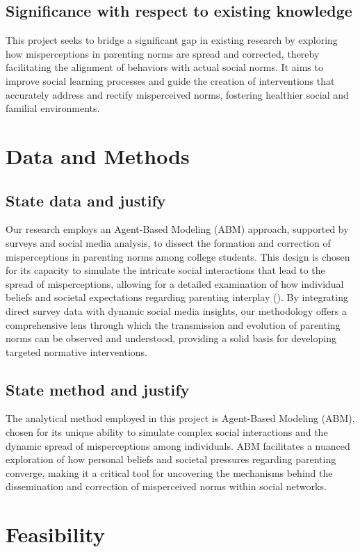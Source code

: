 \documentclass{article}
\begin{document}
\subsection*{Significance with respect to existing knowledge}
This project seeks to bridge a significant gap in existing research by exploring how misperceptions in parenting norms are spread and corrected, thereby facilitating the alignment of behaviors with actual social norms. It aims to improve social learning processes and guide the creation of interventions that accurately address and rectify misperceived norms, fostering healthier social and familial environments.

\section{Data and Methods}
\subsection*{State data and justify}
Our research employs an Agent-Based Modeling (ABM) approach, supported by surveys and social media analysis, to dissect the formation and correction of misperceptions in parenting norms among college students. This design is chosen for its capacity to simulate the intricate social interactions that lead to the spread of misperceptions, allowing for a detailed examination of how individual beliefs and societal expectations regarding parenting interplay (). By integrating direct survey data with dynamic social media insights, our methodology offers a comprehensive lens through which the transmission and evolution of parenting norms can be observed and understood, providing a solid basis for developing targeted normative interventions.


\subsection*{State method and justify}
The analytical method employed in this project is Agent-Based Modeling (ABM), chosen for its unique ability to simulate complex social interactions and the dynamic spread of misperceptions among individuals. ABM facilitates a nuanced exploration of how personal beliefs and societal pressures regarding parenting converge, making it a critical  tool for uncovering the mechanisms behind the dissemination and correction of misperceived norms within social networks.


\section{Feasibility}
\end{document}
